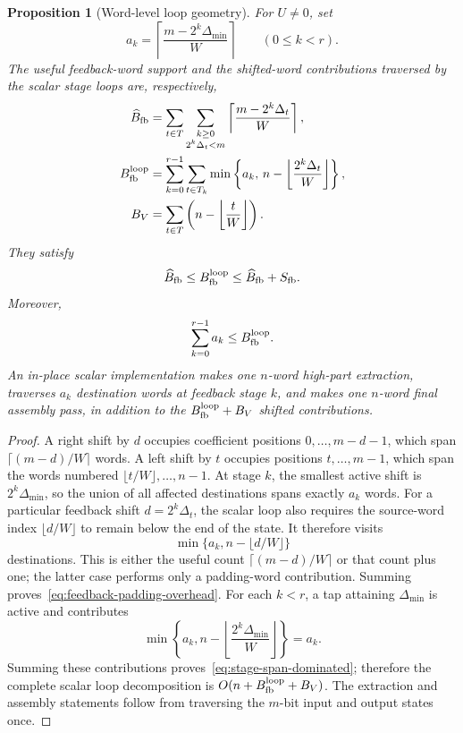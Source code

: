 \documentclass{mcom-l}
\numberwithin{equation}{section}
\newtheorem{proposition}[theorem]{Proposition}
\theoremstyle{definition}
\theoremstyle{remark}
\newcommand{\Dmin}{\Delta_{\min}}
\begin{document}
\begin{proposition}[Word-level loop geometry]
\label{prop:word-geometry}
For $U\ne0$, set
\[
  a_k=\left\lceil\frac{m-2^k\Dmin}{W}\right\rceil
  \qquad(0\le k<r).
\]
The useful feedback-word support and the shifted-word contributions traversed
by the scalar stage loops are, respectively,
\begin{align}
  \widehat B_{\rm fb}
    &=\sum_{t\in T}\sum_{\substack{k\ge0\\2^k\Delta_t<m}}
       \left\lceil\frac{m-2^k\Delta_t}{W}\right\rceil,\\
  B_{\rm fb}^{\rm loop}
    &=\sum_{k=0}^{r-1}\sum_{t\in T_k}
      \min\left\{a_k,\,
        n-\left\lfloor\frac{2^k\Delta_t}{W}\right\rfloor\right\},\\
  B_V
    &=\sum_{t\in T}
       \left(n-\left\lfloor\frac{t}{W}\right\rfloor\right).
\end{align}
They satisfy
\begin{equation}
  \widehat B_{\rm fb}
  \le B_{\rm fb}^{\rm loop}
  \le \widehat B_{\rm fb}+S_{\rm fb}.
  \label{eq:feedback-padding-overhead}
\end{equation}
Moreover,
\begin{equation}
  \sum_{k=0}^{r-1}a_k\le B_{\rm fb}^{\rm loop}.
  \label{eq:stage-span-dominated}
\end{equation}
An in-place scalar implementation makes one $n$-word high-part extraction,
traverses $a_k$ destination words at feedback stage $k$, and makes one
$n$-word final assembly pass, in addition to the
$B_{\rm fb}^{\rm loop}+B_V$ shifted contributions.
\end{proposition}
\begin{proof}
A right shift by $d$ occupies coefficient positions $0,\ldots,m-d-1$, which
span $\lceil(m-d)/W\rceil$ words.  A left shift by $t$ occupies positions
$t,\ldots,m-1$, which span the words numbered
$\lfloor t/W\rfloor,\ldots,n-1$.  At stage $k$, the smallest active shift is
$2^k\Dmin$, so the union of all affected destinations spans exactly $a_k$
words.  For a particular feedback shift $d=2^k\Delta_t$, the scalar loop also
requires the source-word index $\lfloor d/W\rfloor$ to remain below the end of
the state.  It therefore visits
\[
  \min\{a_k,n-\lfloor d/W\rfloor\}
\]
destinations.  This is either the useful count
$\lceil(m-d)/W\rceil$ or that count plus one; the latter case performs only a
padding-word contribution.  Summing proves~\eqref{eq:feedback-padding-overhead}.
For each $k<r$, a tap attaining $\Dmin$ is active and contributes
\[
  \min\left\{a_k,
    n-\left\lfloor\frac{2^k\Dmin}{W}\right\rfloor\right\}=a_k.
\]
Summing these contributions proves~\eqref{eq:stage-span-dominated}; therefore
the complete scalar loop decomposition is
$O(n+B_{\rm fb}^{\rm loop}+B_V)$.
The extraction and assembly statements follow from traversing the $m$-bit
input and output states once.
\end{proof}
\end{document}

